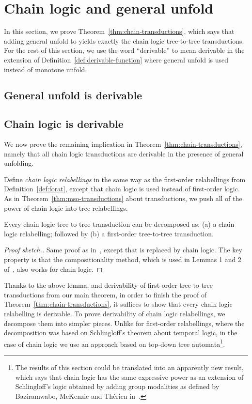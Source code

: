 \section{Chain logic and general unfold}
\label{sec:appendix-chain}
In this section, we prove Theorem~\ref{thm:chain-transductions}, which says that adding general unfold to \mso yields exactly the chain logic tree-to-tree transductions. For the rest of this section, we use the word ``derivable'' to mean derivable in the extension of Definition~\ref{def:derivable-function} where general unfold is used instead of monotone unfold. 

\subsection{General unfold is derivable}


\subsection{Chain logic is derivable}
\label{sec:derive-chain-relabellings}
We now prove the remaining implication in Theorem~\ref{thm:chain-transductions}, namely that all chain logic transductions are derivable in the presence of general unfolding. 

Define  \emph{chain logic relabellings} in the same way as the first-order relabellings from Definition~\ref{def:forat}, except that chain logic is used instead of first-order logic.   As in Theorem~\ref{thm:mso-transductions} about \mso transductions, we push all of the power of chain logic into  tree relabellings.

\begin{lemma}\label{lem:chain-colcombet}
    Every   chain logic tree-to-tree transduction can be decomposed as: (a) a chain logic relabelling; followed by (b) a first-order tree-to-tree transduction. 
\end{lemma}
\begin{proof}[Proof sketch.]
    Same proof as in~\cite[Corollary 1]{colcombetCombinatorialTheoremTrees2007}, except that \mso is replaced  by chain logic. The key property is that the compositionality method, which is used in Lemmas 1 and 2 of~\cite{colcombetCombinatorialTheoremTrees2007},  also works for chain logic. 
\end{proof}

Thanks to the above lemma, and derivability of first-order tree-to-tree transductions from our main theorem, 
in order to finish the proof of Theorem~\ref{thm:chain-transductions}, it suffices to show that every chain logic relabelling is derivable.  
To prove derivability of chain logic relabellings, we  decompose them into simpler pieces. Unlike for first-order relabellings, where the decomposition was based on Schlingloff's theorem about temporal logic, in the case of chain logic we use an approach based on top-down tree automata\footnote{The results of this section could be translated into an apparently new result, which says that chain logic has the same expressive power as an  extension of Schlingloff's logic obtained by adding group modalities as defined by Baziramwabo, McKenzie and  Th{\'e}rien in~\cite[Section 4]{baziramwabo1999modular}.}. 


